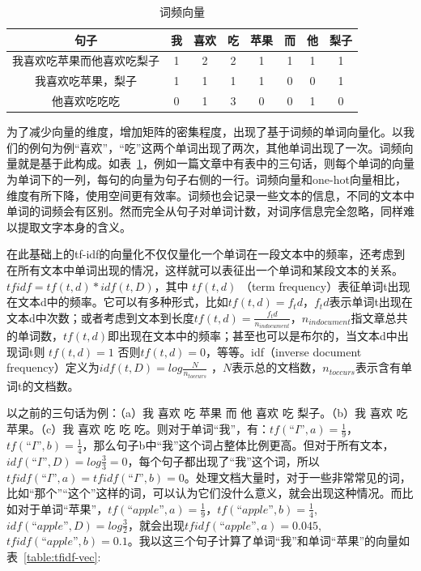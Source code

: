 \begin{table}[!htbp]
\caption{词频向量}
\label{table:frequency-vec}
\centering
\begin{tabular}{|c|c|c|c|c|c|c|c|}
\hline
句子 & 我 & 喜欢 & 吃 & 苹果 & 而 & 他 & 梨子 \\
\hline
我喜欢吃苹果而他喜欢吃梨子 & 1 & 2 & 2 & 1 & 1 & 1 & 1 \\
\hline
我喜欢吃苹果，梨子 & 1 & 1 & 1 & 1 & 0 & 0 & 1 \\
\hline
他喜欢吃吃吃 & 0 & 1 & 3 & 0 & 0 & 1 & 0 \\
\hline
\end{tabular}
\end{table}

为了减少向量的维度，增加矩阵的密集程度，出现了基于词频的单词向量化。以我们的例句为例“喜欢”，“吃”这两个单词出现了两次，其他单词出现了一次。词频向量就是基于此构成。如表~\ref{table:frequency-vec}，例如一篇文章中有表中的三句话，则每个单词的向量为单词下的一列，每句的向量为句子右侧的一行。词频向量和one-hot向量相比，维度有所下降，使用空间更有效率。词频也会记录一些文本的信息，不同的文本中单词的词频会有区别。然而完全从句子对单词计数，对词序信息完全忽略，同样难以提取文字本身的含义。

在此基础上的tf-idf的向量化不仅仅量化一个单词在一段文本中的频率，还考虑到在所有文本中单词出现的情况，这样就可以表征出一个单词和某段文本的关系。\cite{xia2011improvement}$tfidf = tf(t,d)*idf(t,D)$，其中 $tf(t,d)$ （term frequency）表征单词t出现在文本d中的频率。它可以有多种形式，比如$tf(t,d)=f_td$，$f_td$表示单词t出现在文本d中次数；或者考虑到文本到长度$tf(t,d)= \frac{f_td}{n_{in document}}$，$n_{in document}$指文章总共的单词数，$tf(t,d)$即出现在文本中的频率；甚至也可以是布尔的，当文本d中出现词t则 $tf(t,d)=1$ 否则$tf(t,d)=0$，等等。idf（inverse document frequency）定义为$idf(t,D) = log\frac{N}{n_{t occurs}}$ ，$N$表示总的文档数，$n_{t occurs}$表示含有单词t的文档数。

以之前的三句话为例：（a）我 喜欢 吃 苹果 而 他 喜欢 吃 梨子。（b）我 喜欢 吃 苹果。（c）我 喜欢 吃 吃 吃。则对于单词“我”，有：$tf(“I”,a)= \frac{1}{9}$，$tf(“I”,b)= \frac{1}{4}$，那么句子b中“我”这个词占整体比例更高。但对于所有文本，$idf(“I”,D) = log\frac{3}{3} = 0$，每个句子都出现了“我”这个词，所以$tfidf(“I”,a) = tfidf(“I”,b) = 0$。处理文档大量时，对于一些非常常见的词，比如“那个”“这个”这样的词，可以认为它们没什么意义，就会出现这种情况。而比如对于单词“苹果”，$tf(“apple”,a)= \frac{1}{9}$，$tf(“apple”,b)= \frac{1}{4}$,$idf(“apple”,D) = log\frac{3}{2} $，就会出现$tfidf(“apple”,a) = 0.045$,$tfidf(“apple”,b) = 0.1$。我以这三个句子计算了单词“我”和单词“苹果”的向量如表~\ref{table:tfidf-vec}:


